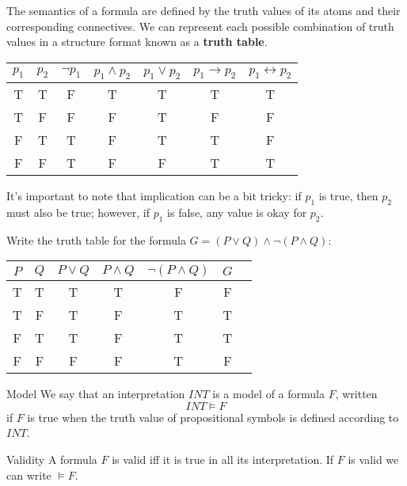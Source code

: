 \documentclass{article}
\begin{document}
The semantics of a formula are defined by the truth values of its atoms and
their corresponding connectives. We can represent each possible combination of
truth values in a structure format known as a \textbf{truth table}.
\begin{center}
    \begin{tabular}{@{ }c@{ }@{ }c | c@{ }c@{ }c@{ }c@{ }c@{ }}
        $p_1$ & $p_2$ & $\neg p_1$ & $p_1\land p_2$ & $p_1\lor p_2$ &
        $p_1\rightarrow p_2$ & $p_1\leftrightarrow p_2$\\
        \hline 
        T & T & F & T & T & T & T\\
        T & F & F & F & T & F & F\\
        F & T & T & F & T & T & F\\
        F & F & T & F & F & T & T\\
    \end{tabular}
\end{center}
It's important to note that implication can be a bit tricky: if $p_1$ is true,
then $p_2$ must also be true; however, if $p_1$ is false, any value is okay
for $p_2$.
\begin{exam}
Write the truth table for the formula $G=(P\lor Q)\land\neg(P\land Q)$:
    \begin{center}
        \begin{tabular}{@{ }c@{ }@{ }c | c@{ }c@{ }c@{ }c@{ }c@{ }}
            $P$ & $Q$ & $P\lor Q$ & $P\land Q$ &
            $\neg(P\land Q)$ & $G$ \\
            \hline 
            T & T & T & T & F & F & \\
            T & F & T & F & T & T & \\
            F & T & T & F & T & T & \\
            F & F & F & F & T & F & \\
        \end{tabular}
    \end{center}
\end{exam}
\begin{Definition}{Model}{}
    We say that an interpretation $INT$ is a model of a formula $F$, written
    $$INT\models F$$
    if $F$ is true when the truth value of propositional symbols is defined
    according to $INT$.
\end{Definition}
\begin{Definition}{Validity}{}
   A formula $F$ is valid iff it is true in all its interpretation. If $F$ is
   valid we can write $\models F$.
\end{Definition}
\end{document}
